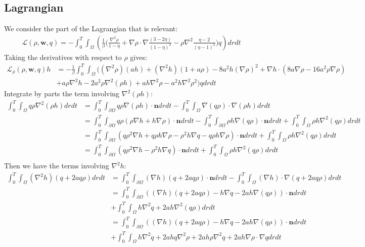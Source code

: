 \documentclass[11pt, a4paper]{article}
\theoremstyle{definition}
\newcommand{\w}{\mathbf{w}}
\newcommand{\n}{\mathbf{n}}
\begin{document}
\subsection{Lagrangian}
We consider the part of the Lagrangian that is relevant:
\begin{align*}
\mathcal{L}(\rho, \w, q) = - \int_0^T \int_\Omega \left(\frac{1}{\beta} \bigg( \frac{\nabla^2 \rho}{1 - \eta} +  \nabla \rho \cdot \nabla \frac{(3- 2 \eta)}{(1 - \eta)^2}  - \rho \nabla^2\frac{\eta - 2}{(\eta - 1)^2} \bigg) q \right) dr dt
\end{align*}
Taking the derivatives with respect to $\rho$ gives:
\begin{align*}
\mathcal{L}_\rho(\rho, \w, q) h &= -\frac{1}{\beta}  \int_0^T \int_\Omega \bigg( (\nabla^2 \rho) ( a h ) + (\nabla^2 h )(1 + a \rho) - 8a^2 h \left(\nabla \rho\right)^2   + \nabla h \cdot \left( 8a \nabla \rho - 16 a^2 \rho \nabla \rho  \right) \\
&+a \rho \nabla ^2 h - 2a^2 \rho \nabla^2(\rho h) + ah \nabla^2 \rho - a^2 h \nabla^2 \rho^2 \bigg) q dr dt
\end{align*}
Integrate by parts the term involving $\nabla^2 (\rho h)$:
\begin{align*}
\int_0^T \int_\Omega q \rho \nabla^2(\rho h) dr dt &= \int_0^T \int_{\partial \Omega} q\rho \nabla(\rho h)\cdot \n dr dt - \int_0^T \int_\Omega \nabla (q \rho) \cdot \nabla (\rho h) dr dt\\
&= \int_0^T \int_{\partial \Omega} q \rho \left(\rho \nabla h + h \nabla \rho \right) \cdot \n dr dt - \int_0^T \int_{\partial \Omega} \rho h \nabla (q\rho) \cdot \n dr dt +
\int_0^T \int_\Omega \rho h \nabla^2 (q\rho)  dr dt\\
&= \int_0^T \int_{\partial \Omega} \left(q \rho^2 \nabla h + q \rho h \nabla \rho  -  \rho^2 h \nabla q - q \rho h \nabla \rho \right)\cdot \n dr dt +
\int_0^T \int_\Omega \rho h \nabla^2 (q\rho)  dr dt\\
&= \int_0^T \int_{\partial \Omega} \left(q \rho^2 \nabla h   -  \rho^2 h \nabla q  \right)\cdot \n dr dt +
\int_0^T \int_\Omega \rho h \nabla^2 (q\rho)  dr dt\\
\end{align*}
Then we have the terms involving $\nabla^2 h$:
\begin{align*}
\int_0^T \int_\Omega  (\nabla^2 h) (q + 2 a q \rho )  dr dt &= \int_0^T \int_{\partial \Omega}(\nabla h) (q + 2 a q \rho ) \cdot \n dr dt - \int_0^T \int_\Omega (\nabla h) \cdot \nabla (q + 2 a q \rho )dr dt\\
&= \int_0^T \int_{\partial \Omega} \left((\nabla h) (q + 2 a q \rho ) -  h \nabla q -2 ah \nabla (q \rho ) \right) \cdot \n  dr dt \\
&+ \int_0^T \int_\Omega  h\nabla^2 q + 2 a h \nabla^2(q \rho ) dr dt\\
&= \int_0^T \int_{\partial \Omega} \left((\nabla h) (q + 2 a q \rho ) -  h \nabla q -2 ah \nabla (q \rho ) \right) \cdot \n  dr dt \\
&+ \int_0^T \int_\Omega  h\nabla^2 q + 2 a h q \nabla^2 \rho + 2 a h  \rho \nabla^2 q + 2 a h \nabla \rho \cdot \nabla q dr dt
\end{align*}
\end{document}

